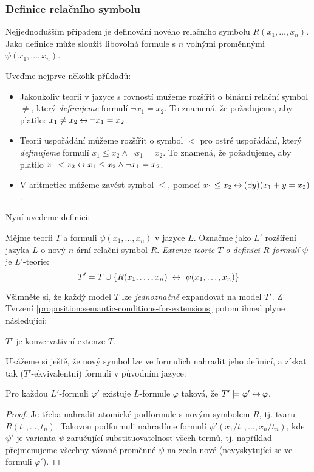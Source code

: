 \subsubsection*{Definice relačního symbolu}

Nejjednodušším případem je definování nového relačního symbolu $R(x_1,\dots,x_n)$. Jako definice může sloužit libovolná formule s $n$ volnými proměnnými $\psi(x_1,\dots,x_n)$.

\begin{example}
Uveďme nejprve několik příkladů:
\begin{itemize}
    \item Jakoukoliv teorii v jazyce s rovností můžeme rozšířit o binární relační symbol $\neq$, který \emph{definujeme} formulí $\neg x_1=x_2$. To znamená, že požadujeme, aby platilo: $x_1\neq x_2\mathbin{\leftrightarrow}\neg x_1=x_2$.
    \item Teorii uspořádání můžeme rozšířit o symbol $<$ pro ostré uspořádání, který \emph{definujeme} formulí $x_1\leq x_2\land \neg x_1=x_2$. To znamená, že požadujeme, aby platilo $x_1<x_2 \mathbin{\leftrightarrow} x_1\leq x_2\land \neg x_1=x_2$.
    \item V aritmetice můžeme zavést symbol $\leq$, pomocí $x_1\leq x_2\mathbin{\leftrightarrow}(\exists y)(x_1+y=x_2)$.
\end{itemize}
\end{example}
Nyní uvedeme definici:
\begin{definition}
    Mějme teorii $T$ a formuli $\psi(x_1,\dots,x_n)$ v jazyce $L$. Označme jako $L'$ rozšíření jazyka $L$ o nový $n$-ární relační symbol $R$. \emph{Extenze teorie $T$ o definici $R$ formulí $\psi$} je $L'$-teorie:
    $$
    T'=T\cup\{R(x_1,\dots,x_n)\ \liff\ \psi(x_1,\dots,x_n)\}
    $$
\end{definition}
Všimněte si, že každý model $T$ lze \emph{jednoznačně} expandovat na model $T'$. Z Tvrzení \ref{proposition:semantic-conditions-for-extensions} potom ihned plyne následující:
\begin{corollary}
    $T'$ je konzervativní extenze $T$.
\end{corollary}

Ukážeme si ještě, že nový symbol lze ve formulích nahradit jeho definicí, a získat tak ($T'$-ekvivalentní) formuli v původním jazyce:

\begin{proposition}
    Pro každou $L'$-formuli $\varphi'$ existuje $L$-formule $\varphi$ taková, že $T'\models\varphi'\mathbin{\leftrightarrow}\varphi$.
\end{proposition}
\begin{proof}
    Je třeba nahradit atomické podformule s novým symbolem $R$, tj. tvaru $R(t_1,\dots,t_n)$. Takovou podformuli nahradíme formulí $\psi'(x_1/t_1,\dots,x_n/t_n)$, kde $\psi'$ je varianta $\psi$ zaručující substituovatelnost všech termů, tj. například přejmenujeme všechny vázané proměnné $\psi$ na zcela nové (nevyskytující se ve formuli $\varphi'$).
\end{proof}


